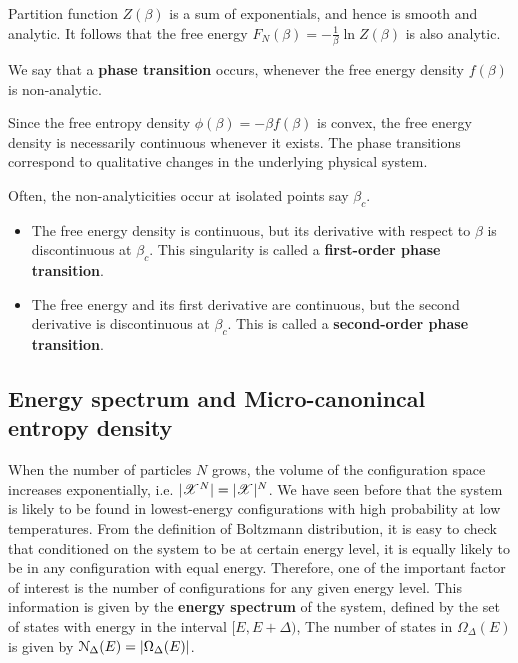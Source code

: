\documentclass[letterpaper,english,10pt]{article}
\begin{document}
Partition function $Z (\beta)$ is a sum of exponentials, and hence is smooth and analytic. 
It follows that the free energy $F_N (\beta) = -\frac{1}{\beta}\ln Z(\beta)$ is also analytic. 
\begin{defn}
We say that a \textbf{phase transition} occurs, whenever the free energy density $f (\beta)$ is non-analytic. 
\end{defn}
Since the free entropy density $\phi (\beta) = -\beta f(\beta)$ is convex, the free energy density is necessarily continuous whenever it exists.
The phase transitions correspond to qualitative changes in the underlying physical system.
\begin{defn}
Often, the non-analyticities occur at isolated points say $\beta_c$.
\begin{itemize}
\item The free energy density is continuous, but its derivative with respect to $\beta$ is discontinuous at $\beta_c$. 
This singularity is called a \textbf{first-order phase transition}.
\item The free energy and its first derivative are continuous, but the second derivative is discontinuous at $\beta_c$. 
This is called a \textbf{second-order phase transition}.
\end{itemize}
\end{defn}


\subsection{Energy spectrum and Micro-canonincal entropy density}
When the number of particles $N$ grows, the volume of the configuration space increases exponentially, 
i.e. $|\mathscr{X}^N| = |\mathscr{X}|^N$. 
We have seen before that the system is likely to be found in lowest-energy configurations with high probability at low temperatures. 
From the definition of Boltzmann distribution, it is easy to check that conditioned on the system to be at  certain energy level, it is equally likely to be in any configuration with equal energy. 
Therefore, one of the important factor of interest is the number of configurations for any given energy level.  
This information is given by the \textbf{energy spectrum} of the system, 
defined by the set of states with energy in the interval $[E, E+\Delta)$, 
The number of states in $\Omega_\Delta(E)$ is given by $\mathcal{N}_\Delta (E) = \left\lvert\Omega_\Delta (E)\right\rvert$. 
\end{document}
